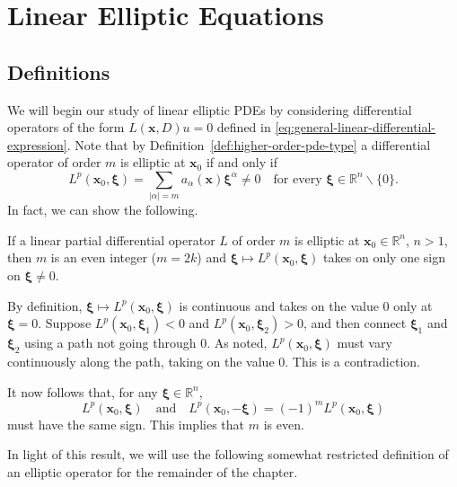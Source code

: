 \section{Linear Elliptic Equations}\label{chap:linear-elliptic-equations}

\subsection{Definitions}\label{sec:elliptic-equation-definitions}

We will begin our study of linear elliptic PDEs by considering differential operators of the form $L(\bm{x},D)u=0$ defined in \eqref{eq:general-linear-differential-expression}. Note that by Definition~\ref{def:higher-order-pde-type} a differential operator of order $m$ is elliptic at $\bm{x}_0$ if and only if
\begin{equation}\label{eq:elliptic-opening-principal-symbol-nonzero}
L^p(\bm{x}_0,\bm{\xi})=\sum_{|\alpha|=m}a_\alpha(\bm{x})\bm{\xi}^\alpha\ne0\quad\text{for every }\bm{\xi}\in\mathbb{R}^n\backslash\{0\}.
\end{equation}
In fact, we can show the following.

\begin{Lemma}
\label{lem:elliptic-operator-even-order-fixed-sign}
If a linear partial differential operator $L$ of order $m$ is elliptic at $\bm{x}_0\in\mathbb{R}^n$, $n>1$, then $m$ is an even integer ($m=2k$) and $\bm{\xi}\mapsto L^p(\bm{x}_0,\bm{\xi})$ takes on only one sign on $\bm{\xi}\ne0$.
\end{Lemma}

\begin{Proof}
By definition, $\bm{\xi}\mapsto L^p(\bm{x}_0,\bm{\xi})$ is continuous and takes on the value $0$ only at $\bm{\xi}=0$. Suppose $L^p(\bm{x}_0,\bm{\xi}_1)<0$ and $L^p(\bm{x}_0,\bm{\xi}_2)>0$, and then connect $\bm{\xi}_1$ and $\bm{\xi}_2$ using a path not going through $0$. As noted, $L^p(\bm{x}_0,\bm{\xi})$ must vary continuously along the path, taking on the value $0$. This is a contradiction.

It now follows that, for any $\bm{\xi}\in\mathbb{R}^n$,\[L^p(\bm{x}_0,\bm{\xi})\quad\text{and}\quad L^p(\bm{x}_0,-\bm{\xi})=(-1)^mL^p(\bm{x}_0,\bm{\xi})\]must have the same sign. This implies that $m$ is even.
\end{Proof}

In light of this result, we will use the following somewhat restricted definition of an elliptic operator for the remainder of the chapter.


